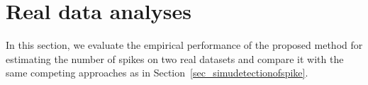 \documentclass[12pt]{article}
\theoremstyle{plain}
\numberwithin{equation}{section}
\begin{document}
				
				
				
				
				
				
				\section{Real data analyses}
				\label{sec:real_data}
				
				In this section, we evaluate the empirical performance of the proposed method for estimating the number of spikes on two real datasets and compare it with the same competing approaches as in Section~\ref{sec_simudetectionofspike}.
				
\end{document}
